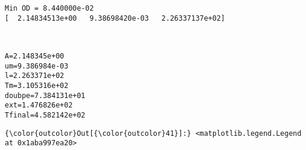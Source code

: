 \documentclass[11pt]{article}
\begin{document}
    \begin{Verbatim}[commandchars=\\\{\}]
Min OD = 8.440000e-02
[  2.14834513e+00   9.38698420e-03   2.26337137e+02]

    \end{Verbatim}

    \begin{center}
    \end{center}
    { \hspace*{\fill} \\}
    
    \begin{Verbatim}[commandchars=\\\{\}]
A=2.148345e+00
um=9.386984e-03
l=2.263371e+02
Tm=3.105316e+02
doubpe=7.384131e+01
ext=1.476826e+02
Tfinal=4.582142e+02

    \end{Verbatim}

            \begin{Verbatim}[commandchars=\\\{\}]
{\color{outcolor}Out[{\color{outcolor}41}]:} <matplotlib.legend.Legend at 0x1aba997ea20>
\end{Verbatim}
        
    \begin{center}
    \end{center}
    { \hspace*{\fill} \\}
    
    \begin{center}
    \end{center}
    { \hspace*{\fill} \\}
    
\end{document}
